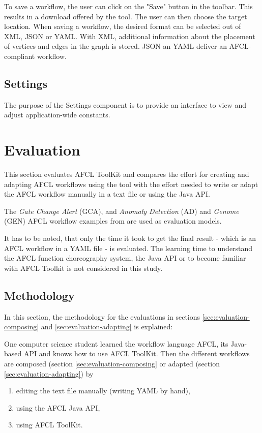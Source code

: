 \documentclass[a4paper,top=25mm,bottom=25mm,12pt,pdftex,halfparskip,twoside,bibtotoc,numbers=noenddot]{scrbook}
\begin{document}
To save a workflow, the user can click on the "Save" button in the toolbar.
This results in a download offered by the tool. The user can then choose the target location.  When saving a workflow, the desired format can be selected out of XML, JSON or YAML. With XML, additional information about the placement of vertices and edges in the graph is stored. JSON an YAML deliver an AFCL-compliant workflow.

\section{Settings}

The purpose of the Settings component is to provide an interface to view and adjust application-wide constants. 


\chapter{Evaluation}

This section evaluates AFCL ToolKit and compares the effort for creating and adapting AFCL workflows using the tool with the effort needed to write or adapt the AFCL workflow manually in a text file or using the Java API.

The \textit{Gate Change Alert}  (GCA), and \textit{Anomaly Detection} (AD) and \textit{Genome} (GEN) AFCL workflow examples from \citep{online-afcl-dps} are used as evaluation models.

It has to be noted, that only the time it took to get the final result - which is an AFCL workflow in a YAML file - is evaluated.
The learning time to understand the AFCL function choreography system, the Java API or to become familiar with AFCL Toolkit is not considered in this study.

\section{Methodology}

In this section, the methodology for the evaluations in sections \ref{sec:evaluation-composing} and \ref{sec:evaluation-adapting} is explained:

One computer science student learned the workflow language AFCL, its Java-based API and knows how to use AFCL ToolKit.
Then the different workflows are composed (section \ref{sec:evaluation-composing} or adapted (section \ref{sec:evaluation-adapting}) by
\begin{enumerate}[label={(\arabic*)}]
	\item editing the text file manually (writing YAML by hand),
	\item using the AFCL Java API,
	\item using AFCL ToolKit.
\end{enumerate}
\end{document}
